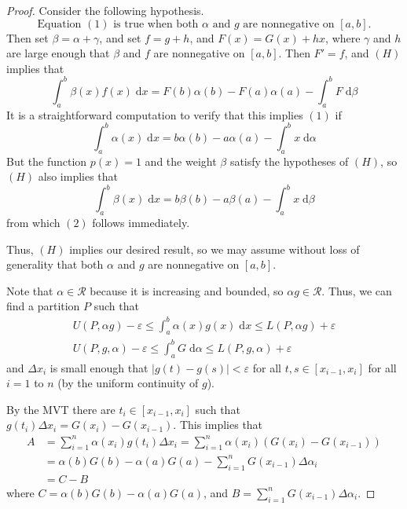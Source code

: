 \documentclass{homework}
\begin{document}
	\begin{proof}
		Consider the following hypothesis.
		\begin{equation}
			\tag{H}
			\text{Equation $(1)$ is true when both $\alpha$ and $g$ are nonnegative on $[a,b]$}.
		\end{equation}
		Then set $\beta = \alpha + \gamma$, and set $f = g + h$, and $F(x) = G(x) + hx$, where $\gamma$ and $h$ are large enough that $\beta$ and $f$ are nonnegative on $[a,b]$. Then $F' = f$, and $(H)$ implies that
		$$
		\int_a^b\beta(x)f(x)\;\text{d}x = F(b)\alpha(b) - F(a)\alpha(a) - \int_a^b F\;\text{d}\beta
		$$
		It is a straightforward computation to verify that this implies $(1)$ if
		\begin{equation}
			\tag{2}
			\int_a^b\alpha(x)\;\text{d}x = b\alpha(b) - a\alpha(a) - \int_a^bx \;\text{d}\alpha
		\end{equation}
		But the function $p(x) = 1$ and the weight $\beta$ satisfy the hypotheses of $(H)$, so $(H)$ also implies that
		$$
		\int_a^b \beta(x)\;\text{d}x = b\beta(b) - a\beta(a) - \int_a^bx\;\text{d}\beta
		$$
		from which $(2)$ follows immediately.
		
		Thus, $(H)$ implies our desired result, so we may assume without loss of generality that both $\alpha$ and $g$ are nonnegative on $[a,b]$.
		
		Note that $\alpha \in \mathscr{R}$ because it is increasing and bounded, so $\alpha g\in\mathscr{R}$. Thus, we can find a partition $P$ such that
		$$
		\begin{gathered}
			U(P, \alpha g) - \varepsilon \le \int_a^b\alpha(x)g(x)\;\text{d}x \le L(P, \alpha g) + \varepsilon\\ 
			U(P, g, \alpha) - \varepsilon \le \int_a^b G \;\text{d}\alpha \le L(P, g, \alpha) + \varepsilon
		\end{gathered}
		$$
		and $\Delta x_i$ is small enough that $|g(t) - g(s)| < \varepsilon$ for all $t,s \in [x_{i-1}, x_i]$ for all $i =1$ to $n$ (by the uniform continuity of $g$).
		
		By the MVT there are $t_i \in [x_{i-1},x_i]$ such that $g(t_i)\Delta x_i = G(x_i) - G(x_{i-1})$. This implies that
		$$
		\begin{aligned}
			A &= \sum_{i=1}^n \alpha(x_i)g(t_i)\Delta x_i = \sum_{i=1}^n \alpha(x_i) (G(x_i) - G(x_{i-1}))\\
			&= \alpha(b)G(b)-\alpha(a)G(a) - \sum_{i=1}^nG(x_{i-1})\Delta \alpha_i\\
			&= C - B
		\end{aligned}
		$$
		where $C = \alpha(b)G(b) - \alpha(a)G(a)$, and $B = \sum_{i=1}^n G(x_{i-1})\Delta \alpha_i$. 
		

\end{proof}
\end{document}
